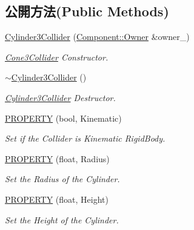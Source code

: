 \subsection*{公開方法(Public Methods)}
\begin{DoxyCompactItemize}
\item 
\hyperlink{class_i_dream_sky_1_1_cylinder3_collider_afbc1ecf758fb81a7c48546142da25e5e}{Cylinder3\+Collider} (\hyperlink{class_i_dream_sky_1_1_component_1_1_owner}{Component\+::\+Owner} \&owner\+\_\+)
\begin{DoxyCompactList}\small\item\em \hyperlink{class_i_dream_sky_1_1_cone3_collider}{Cone3\+Collider} Constructor. \end{DoxyCompactList}\item 
\hyperlink{class_i_dream_sky_1_1_cylinder3_collider_ab4873181f3b2a607df54ea51303143bc}{$\sim$\+Cylinder3\+Collider} ()
\begin{DoxyCompactList}\small\item\em \hyperlink{class_i_dream_sky_1_1_cylinder3_collider}{Cylinder3\+Collider} Destructor. \end{DoxyCompactList}\item 
\hyperlink{class_i_dream_sky_1_1_cylinder3_collider_a5b0dfca7fcf2f49903ebe0c06ad72e4f}{P\+R\+O\+P\+E\+R\+TY} (bool, Kinematic)
\begin{DoxyCompactList}\small\item\em Set if the Collider is Kinematic Rigid\+Body. \end{DoxyCompactList}\item 
\hyperlink{class_i_dream_sky_1_1_cylinder3_collider_a217a83d8d405fbcc6d8b54c33d7cab2a}{P\+R\+O\+P\+E\+R\+TY} (float, Radius)
\begin{DoxyCompactList}\small\item\em Set the Radius of the Cylinder. \end{DoxyCompactList}\item 
\hyperlink{class_i_dream_sky_1_1_cylinder3_collider_a04e4823b3e1679d0debba475f176eeef}{P\+R\+O\+P\+E\+R\+TY} (float, Height)
\begin{DoxyCompactList}\small\item\em Set the Height of the Cylinder. \end{DoxyCompactList}\end{DoxyCompactItemize}
